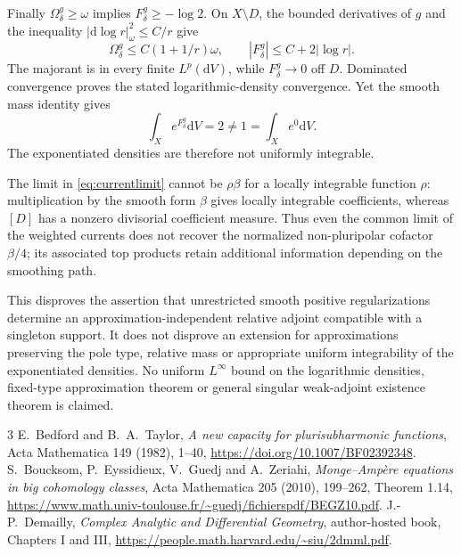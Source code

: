 \documentclass[11pt]{article}
\begin{document}
Finally $\Omega_\delta^g\ge\omega$ implies
$F_\delta^g\ge-\log2$. On $X\setminus D$, the bounded derivatives
of $g$ and the inequality $|\mathrm d\log r|_\omega^2\le C/r$ give
\[
 \Omega_\delta^g\le C(1+1/r)\omega,\qquad
 |F_\delta^g|\le C+2|\log r|.
\]
The majorant is in every finite $L^p(\mathrm dV)$, while
$F_\delta^g\to0$ off $D$. Dominated convergence proves the stated
logarithmic-density convergence. Yet the smooth mass identity gives
\[
 \int_Xe^{F_\delta^g}\mathrm dV=2\ne1=\int_Xe^0\mathrm dV.
\]
The exponentiated densities are therefore not uniformly integrable.

The limit in \eqref{eq:currentlimit} cannot be $\rho\beta$ for a
locally integrable function $\rho$: multiplication by the smooth
form $\beta$ gives locally integrable coefficients, whereas $[D]$
has a nonzero divisorial coefficient measure. Thus even the common
limit of the weighted currents does not recover the normalized
non-pluripolar cofactor $\beta/4$; its associated top products retain
additional information depending on the smoothing path.

This disproves the assertion that unrestricted smooth positive
regularizations determine an approximation-independent relative
adjoint compatible with a singleton support. It does not disprove
an extension for approximations preserving the pole type, relative
mass or appropriate uniform integrability of the exponentiated
densities. No uniform $L^\infty$ bound on the logarithmic densities,
fixed-type approximation theorem or general singular weak-adjoint
existence theorem is claimed.

\begin{thebibliography}{3}
 E.~Bedford and B.~A.~Taylor,
\emph{A new capacity for plurisubharmonic functions},
Acta Mathematica 149 (1982), 1--40,
\url{https://doi.org/10.1007/BF02392348}.
 S.~Boucksom, P.~Eyssidieux, V.~Guedj and A.~Zeriahi,
\emph{Monge--Amp\`ere equations in big cohomology classes},
Acta Mathematica 205 (2010), 199--262, Theorem 1.14,
\url{https://www.math.univ-toulouse.fr/~guedj/fichierspdf/BEGZ10.pdf}.
 J.-P.~Demailly,
\emph{Complex Analytic and Differential Geometry},
author-hosted book, Chapters I and III,
\url{https://people.math.harvard.edu/~siu/2dmml.pdf}.
\end{thebibliography}
\end{document}
